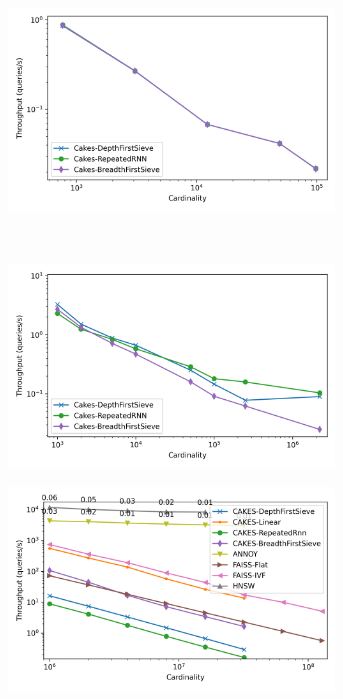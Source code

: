 \begin{figure}
\begin{subfigure}[b]{0.47\textwidth}
        \label{fig:results:sift-scaling}
    \end{subfigure}%
    \begin{subfigure}[b]{0.47\textwidth}
        \includegraphics[width=0.95\textwidth]{plots/radio-ml-knn-10.png}
        \label{fig:results:radioml-scaling}
    \end{subfigure}%
    \vspace{1em}
    \\
    \begin{subfigure}[b]{0.47\textwidth}
        \includegraphics[width=0.95\textwidth]{plots/silva-knn-10.png}
        \label{fig:results:silva-scaling}
    \end{subfigure}%
    \begin{subfigure}[b]{0.47\textwidth}
        \includegraphics[width=0.95\textwidth]{plots/random-knn-10.png}

\end{subfigure}
\end{figure}
